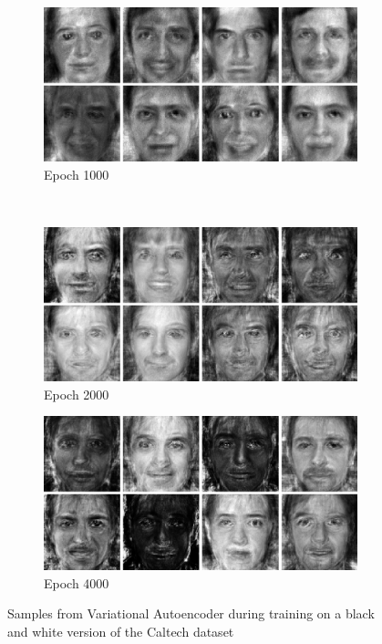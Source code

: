 \begin{figure}[h!]
    \begin{subfigure}[b]{0.45\textwidth}
         \includegraphics[width=\textwidth]{fig/vae/caltech_epoch1000}
        \caption{Epoch 1000}
    \end{subfigure}
    ~
    \begin{subfigure}[b]{0.45\textwidth}
         \includegraphics[width=\textwidth]{fig/vae/caltech_epoch2000}
        \caption{Epoch 2000}
    \end{subfigure}

    \begin{subfigure}[b]{\textwidth}
         \includegraphics[width=\textwidth]{fig/vae/caltech_epoch4000}
        \caption{Epoch 4000}
    \end{subfigure}
    \caption{Samples from Variational Autoencoder  during training on a black and white version of the Caltech dataset}
    \label{vaq-bwffhq-samples}
\end{figure}

